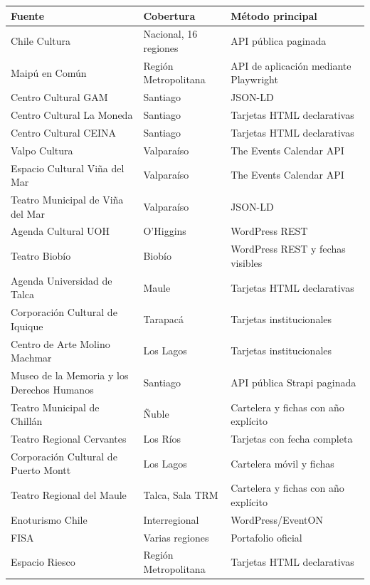 \documentclass[11pt,a4paper]{article}
\begin{document}
\small
\begin{longtable}{p{}p{}p{}}
\toprule
\textbf{Fuente} & \textbf{Cobertura} & \textbf{M\'{e}todo principal} \\
\midrule
\endhead
Chile Cultura & Nacional, 16 regiones & API p\'{u}blica paginada \\
Maip\'{u} en Com\'{u}n & Regi\'{o}n Metropolitana & API de aplicaci\'{o}n mediante Playwright \\
Centro Cultural GAM & Santiago & JSON-LD \\
Centro Cultural La Moneda & Santiago & Tarjetas HTML declarativas \\
Centro Cultural CEINA & Santiago & Tarjetas HTML declarativas \\
Valpo Cultura & Valpara\'{i}so & The Events Calendar API \\
Espacio Cultural Vi\~{n}a del Mar & Valpara\'{i}so & The Events Calendar API \\
Teatro Municipal de Vi\~{n}a del Mar & Valpara\'{i}so & JSON-LD \\
Agenda Cultural UOH & O'Higgins & WordPress REST \\
Teatro Biob\'{i}o & Biob\'{i}o & WordPress REST y fechas visibles \\
Agenda Universidad de Talca & Maule & Tarjetas HTML declarativas \\
Corporaci\'{o}n Cultural de Iquique & Tarapac\'{a} & Tarjetas institucionales \\
Centro de Arte Molino Machmar & Los Lagos & Tarjetas institucionales \\
Museo de la Memoria y los Derechos Humanos & Santiago & API p\'{u}blica Strapi paginada \\
Teatro Municipal de Chill\'{a}n & \~{N}uble & Cartelera y fichas con a\~{n}o expl\'{i}cito \\
Teatro Regional Cervantes & Los R\'{i}os & Tarjetas con fecha completa \\
Corporaci\'{o}n Cultural de Puerto Montt & Los Lagos & Cartelera m\'{o}vil y fichas \\
Teatro Regional del Maule & Talca, Sala TRM & Cartelera y fichas con a\~{n}o expl\'{i}cito \\
Enoturismo Chile & Interregional & WordPress/EventON \\
FISA & Varias regiones & Portafolio oficial \\
Espacio Riesco & Regi\'{o}n Metropolitana & Tarjetas HTML declarativas \\

\end{longtable}
\end{document}
